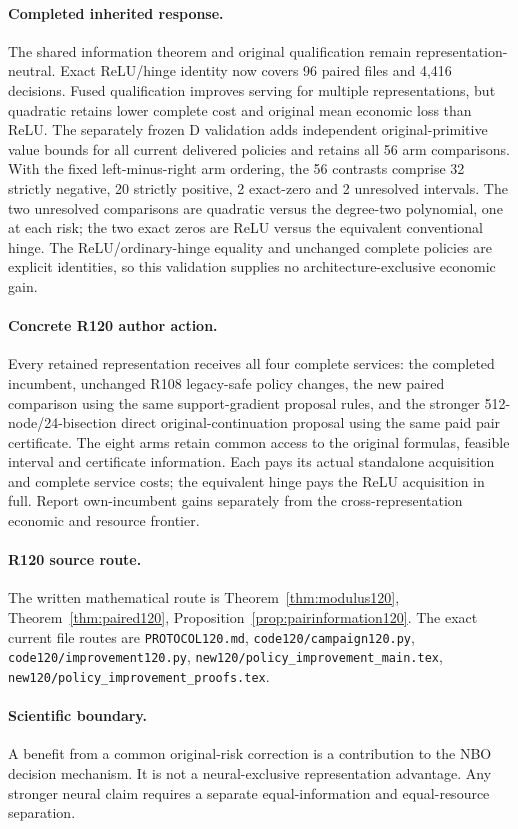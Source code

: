 \paragraph{Completed inherited response.}
The shared information theorem and original qualification remain representation-neutral. Exact ReLU/hinge identity now covers 96 paired files and 4,416 decisions. Fused qualification improves serving for multiple representations, but quadratic retains lower complete cost and original mean economic loss than ReLU. The separately frozen D validation adds independent original-primitive value bounds for all current delivered policies and retains all 56 arm comparisons. With the fixed left-minus-right arm ordering, the 56 contrasts comprise 32 strictly negative, 20 strictly positive, 2 exact-zero and 2 unresolved intervals. The two unresolved comparisons are quadratic versus the degree-two polynomial, one at each risk; the two exact zeros are ReLU versus the equivalent conventional hinge. The ReLU/ordinary-hinge equality and unchanged complete policies are explicit identities, so this validation supplies no architecture-exclusive economic gain.
\paragraph{Concrete R120 author action.}
Every retained representation receives all four complete services: the completed incumbent, unchanged R108 legacy-safe policy changes, the new paired comparison using the same support-gradient proposal rules, and the stronger 512-node/24-bisection direct original-continuation proposal using the same paid pair certificate. The eight arms retain common access to the original formulas, feasible interval and certificate information. Each pays its actual standalone acquisition and complete service costs; the equivalent hinge pays the ReLU acquisition in full. Report own-incumbent gains separately from the cross-representation economic and resource frontier.
\paragraph{R120 source route.}
The written mathematical route is Theorem~\ref{thm:modulus120}, Theorem~\ref{thm:paired120}, Proposition~\ref{prop:pairinformation120}. The exact current file routes are \nolinkurl{PROTOCOL120.md}, \nolinkurl{code120/campaign120.py}, \nolinkurl{code120/improvement120.py}, \nolinkurl{new120/policy_improvement_main.tex}, \nolinkurl{new120/policy_improvement_proofs.tex}.
\paragraph{Scientific boundary.}
A benefit from a common original-risk correction is a contribution to the NBO decision mechanism. It is not a neural-exclusive representation advantage. Any stronger neural claim requires a separate equal-information and equal-resource separation.


